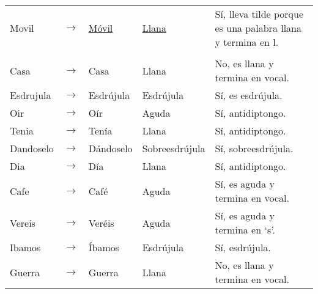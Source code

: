 \documentclass{article}
\begin{document}
	\begin{tabular}{@{}lcllp{3.25in}}
	Movil & $\rightarrow$ & \underline{Móvil} & \underline{Llana} & Sí, lleva tilde porque es una palabra llana y termina en l. \\
	& & & & \\
	Casa      & $\rightarrow$ & Casa        & Llana            & No, es llana y termina en vocal. \\
	Esdrujula & $\rightarrow$ & Esdr\'ujula & Esdr\'ujula      & S\'i, es esdr\'ujula. \\
	Oir       & $\rightarrow$ & O\'ir       & Aguda            & S\'i, antidiptongo. \\
	Tenia     & $\rightarrow$ & Ten\'ia     & Llana            & S\'i, antidiptongo. \\
	Dandoselo & $\rightarrow$ & D\'andoselo & Sobreesdr\'ujula & S\'i, sobreesdr\'ujula. \\
	Dia       & $\rightarrow$ & D\'ia       & Llana            & S\'i, antidiptongo. \\
	Cafe      & $\rightarrow$ & Caf\'e      & Aguda            & S\'i, es aguda y termina en vocal. \\
	Vereis    & $\rightarrow$ & Ver\'eis    & Aguda            & S\'i, es aguda y termina en `s'. \\
	Ibamos    & $\rightarrow$ & \'Ibamos    & Esdr\'ujula      & S\'i, esdr\'ujula. \\
	Guerra    & $\rightarrow$ & Guerra      & Llana            & No, es llana y termina en vocal. \\

	\end{tabular}
\end{document}
